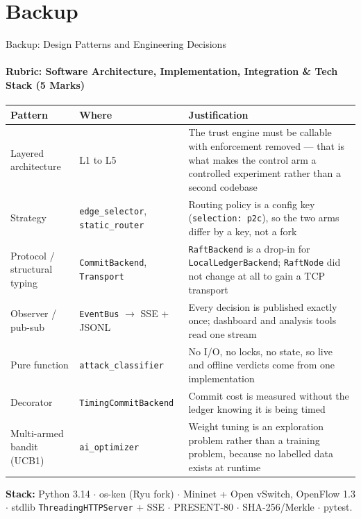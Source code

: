 \documentclass[aspectratio=169, 11pt]{beamer}
\newcommand{\rubric}[1]{Rubric: #1}
\begin{document}
\section*{Backup}

\begin{frame}{Backup: Design Patterns and Engineering Decisions}
    \framesubtitle{\rubric{Software Architecture, Implementation, Integration \& Tech Stack (5 Marks)}}
    \centering\tiny
    \begin{tabular}{@{}p{}p{}p{}@{}}
      \toprule
      \textbf{Pattern} & \textbf{Where} & \textbf{Justification}\\
      \midrule
      Layered architecture & L1 to L5 & The trust engine must be callable with enforcement removed --- that is what makes the control arm a controlled experiment rather than a second codebase\\
      Strategy & \texttt{edge\_selector}, \texttt{static\_router} & Routing policy is a config key (\texttt{selection: p2c}), so the two arms differ by a key, not a fork\\
      Protocol / structural typing & \texttt{CommitBackend}, \texttt{Transport} & \texttt{RaftBackend} is a drop-in for \texttt{LocalLedgerBackend}; \texttt{RaftNode} did not change at all to gain a TCP transport\\
      Observer / pub-sub & \texttt{EventBus} $\to$ SSE + JSONL & Every decision is published exactly once; dashboard and analysis tools read one stream\\
      Pure function & \texttt{attack\_classifier} & No I/O, no locks, no state, so live and offline verdicts come from one implementation\\
      Decorator & \texttt{TimingCommitBackend} & Commit cost is measured without the ledger knowing it is being timed\\
      Multi-armed bandit (UCB1) & \texttt{ai\_optimizer} & Weight tuning is an exploration problem rather than a training problem, because no labelled data exists at runtime\\
      \bottomrule
    \end{tabular}

    \vspace{3pt}\tiny
    \textbf{Stack:} Python 3.14 $\cdot$ os-ken (Ryu fork) $\cdot$ Mininet + Open vSwitch, OpenFlow 1.3 $\cdot$
    stdlib \texttt{ThreadingHTTPServer} + SSE $\cdot$ PRESENT-80 $\cdot$ SHA-256/Merkle $\cdot$ pytest.
\end{frame}
\end{document}
